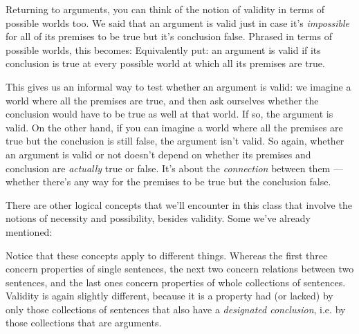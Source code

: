 Returning to arguments, you can think of the notion of validity in terms of possible worlds too.  We said that an argument is valid just in case it's \emph{impossible} for all of its premises to be true but it's conclusion false.  Phrased in terms of possible worlds, this becomes:
Equivalently put: an argument is valid if its conclusion is true at every possible world at which all its premises are true. 

This gives us an informal way to test whether an argument is valid: we imagine a world where all the premises are true, and then ask ourselves whether the conclusion would have to be true as well at that world.  If so, the argument is valid.  On the other hand, if you can imagine a world where all the premises are true but the conclusion is still false, the argument isn't valid.  So again, whether an argument is valid or not doesn't depend on whether its premises and conclusion are \emph{actually} true or false.  It's about the \emph{connection} between them --- whether there's any way for the premises to be true but the conclusion false.

There are other logical concepts that we'll encounter in this class that involve the notions of necessity and possibility, besides validity.  Some we've already mentioned:


Notice that these concepts apply to different things. Whereas the first three concern properties of single sentences, the next two concern relations between two sentences, and the last ones concern properties of whole collections of sentences.  Validity is again slightly different, because it is a property had (or lacked) by only those collections of sentences that also have a \emph{designated conclusion}, i.e. by those collections that are arguments.    

